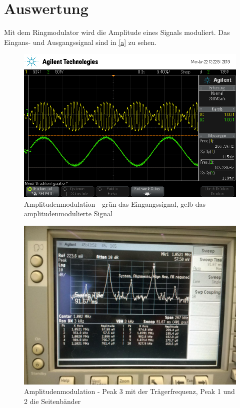 \section{Auswertung}

Mit dem Ringmodulator wird die Amplitude eines Signals moduliert. Das Eingans- und Ausgangssignal sind in \autoref{a} zu sehen.

\begin{figure}
	\centering
	\includegraphics[width=\textwidth]{img/a_scope_230.png}
	\caption{Amplitudenmodulation - grün das Eingangssignal, gelb das amplitudenmodulierte Signal}
	\label{a}
\end{figure}

\begin{figure}
	\centering
	\includegraphics[width=\textwidth]{img/Aufgabenteil_b.jpg}
	\caption{Amplitudenmodulation - Peak 3 mit der Trägerfrequenz, Peak 1 und 2 die Seitenbänder}
\end{figure}

